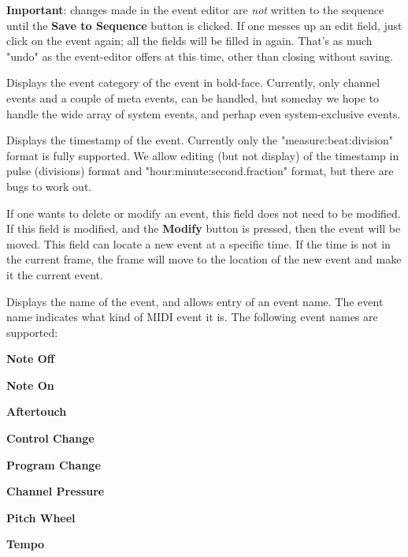    \textbf{Important}: changes made in the event editor
   are \textsl{not} written to the sequence until the \textbf{Save to Sequence}
   button is clicked.  If one messes up an edit field, just click on the event
   again; all the fields will be filled in again.
   That's as much "undo" as the event-editor offers at this time, other than
   closing without saving.

   \setcounter{ItemCounter}{0}      %

   Displays the event category of the event in bold-face.
   Currently, only channel events
   and a couple of meta events,
   can be handled, but someday we hope to handle the wide array of system
   events, and perhap even system-exclusive events.

   Displays the timestamp of the event.  Currently only the
   "measure:beat:division" format is fully supported.
   We allow editing (but not display) of the timestamp in
   pulse (divisions) format and "hour:minute:second.fraction" format, but
   there are bugs to work out.

   If one wants to delete or modify an event, this field does not need to be
   modified.  If this field is modified, and the \textbf{Modify}
   button is pressed, then the event will be moved.  This field can locate
   a new event at a specific time.  If the time is not in the current frame,
   the frame will move to the location of the new event and make it the current
   event.

   Displays the name of the event, and allows entry of an event name.
   The event name indicates what kind of MIDI event it is. 
   The following event names are supported:

   \begin{enumber}
      \item \textbf{Note Off}
      \item \textbf{Note On}
      \item \textbf{Aftertouch}
      \item \textbf{Control Change}
      \item \textbf{Program Change}
      \item \textbf{Channel Pressure}
      \item \textbf{Pitch Wheel}
      \item \textbf{Tempo}
   \end{enumber}

